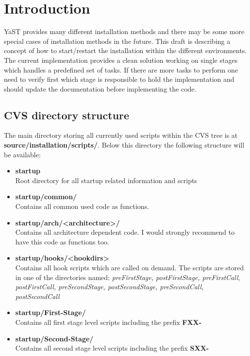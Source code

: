 \chapter{Introduction}

YaST provides many different installation methods and there may be
some more special cases of installation methods in the future. This draft is
describing a concept of how to start/restart the installation within the
different environments. The current implementation provides a clean
solution working on single stages which handles a predefined set of tasks.
If there are more tasks to perform one need to verify first which stage
is responsible to hold the implementation and should update the documentation
before implementing the code.

\section{CVS directory structure}
The main directory storing all currently used scripts within the CVS
tree is at \textbf{source/installation/scripts/}. Below this directory
the following structure will be available:

\begin{itemize}
\item \textbf{startup}\\
      Root directory for all startup related information and scripts
\item \textbf{startup/common/}\\
      Contains all common used code as functions.
\item \textbf{startup/arch/<architecture>/}\\
      Contains all architecture dependent code. I would strongly recommend
      to have this code as functions too.
\item \textbf{startup/hooks/<hookdirs>}\\
      Contains all hook scripts which are called on demand. The scripts
      are stored in one of the directories named:
      \textit{preFirstStage, postFirstStage, preFirstCall, postFirstCall,}
      \textit{preSecondStage, postSecondStage, preSecondCall, postSecondCall}
\item \textbf{startup/First-Stage/}\\
      Contains all first stage level scripts including the prefix
      \textbf{FXX-}
\item \textbf{startup/Second-Stage/}\\
      Contains all second stage level scripts including the prefix
      \textbf{SXX-}
\end{itemize}

